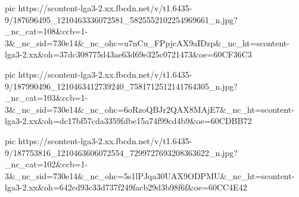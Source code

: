   pic https://scontent-lga3-2.xx.fbcdn.net/v/t1.6435-9/187696495_1210463336072581_5825552102254969661_n.jpg?_nc_cat=108&ccb=1-3&_nc_sid=730e14&_nc_ohc=u7nCu_FPpjcAX9aIDzp&_nc_ht=scontent-lga3-2.xx&oh=37dc308775d43ae63d69e325c0721473&oe=60CF36C3

  pic https://scontent-lga3-2.xx.fbcdn.net/v/t1.6435-9/187990496_1210463412739240_7581712512141764305_n.jpg?_nc_cat=103&ccb=1-3&_nc_sid=730e14&_nc_ohc=6oRzoQBJr2QAX8MAjE7&_nc_ht=scontent-lga3-2.xx&oh=dc17bf57cda3359fdbe15a74f99cd4b9&oe=60CDBB72

  pic https://scontent-lga3-2.xx.fbcdn.net/v/t1.6435-9/187753816_1210463606072554_7299727693208363622_n.jpg?_nc_cat=102&ccb=1-3&_nc_sid=730e14&_nc_ohc=5s1lPJqa30UAX9ODPMU&_nc_ht=scontent-lga3-2.xx&oh=642cd93c33d737f249facb29d3b98f6f&oe=60CC4E42
\fi

